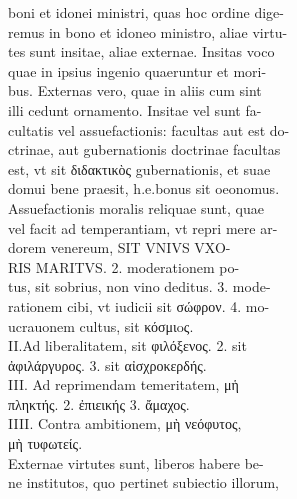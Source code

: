 \documentclass{article}
\begin{document}
\begin{pages}
                boni et idonei ministri, quas hoc ordine dige- \\
                remus in bono et idoneo ministro, aliae virtu- \\
                tes sunt insitae, aliae externae. Insitas voco \\
                quae in ipsius ingenio quaeruntur et mori- \\
                bus. Externas vero, quae in aliis cum sint \\
                illi cedunt ornamento. Insitae vel sunt fa- \\
                cultatis vel assuefactionis: facultas aut est do- \\
                ctrinae, aut gubernationis doctrinae facultas \\
                est, vt sit διδακτικὸς gubernationis, et suae \\
                domui bene praesit, h.e.bonus sit oeonomus. \\
                Assuefactionis moralis reliquae sunt, quae \\
                vel facit ad temperantiam, vt repri mere ar- \\
                dorem venereum, SIT VNIVS VXO- \\
                RIS MARITVS. 2. moderationem po- \\
                tus, sit sobrius, non vino deditus. 3. mode- \\
                rationem cibi, vt iudicii sit σώφρον. 4. mo- \\
                ucrauonem cultus, sit κόσμιoς. \\
                II.Ad liberalitatem, sit φιλόξενος. 2. sit \\
                ἀφιλάργυρος. 3. sit αἰσχροκερδής. \\
                III. Ad reprimendam temeritatem, μἡ \\
                πληκτής. 2. ἐπιεικής 3. ἄμαχος. \\
                IIII. Contra ambitionem, μὴ νεόφυτος, \\
                μὴ τυφωτείς. \\
                Externae virtutes sunt, liberos habere be- \\
                ne institutos, quo pertinet subiectio illorum, \\

\end{pages}
\end{document}
